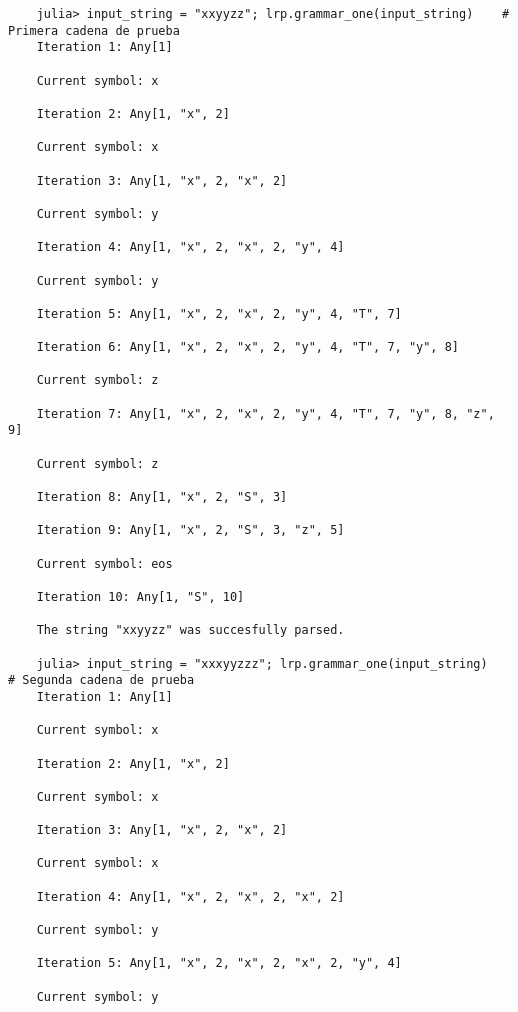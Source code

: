 \begin{verbatim}
    julia> input_string = "xxyyzz"; lrp.grammar_one(input_string)    # Primera cadena de prueba
    Iteration 1: Any[1] 

    Current symbol: x 

    Iteration 2: Any[1, "x", 2] 

    Current symbol: x 

    Iteration 3: Any[1, "x", 2, "x", 2] 

    Current symbol: y 

    Iteration 4: Any[1, "x", 2, "x", 2, "y", 4] 

    Current symbol: y 

    Iteration 5: Any[1, "x", 2, "x", 2, "y", 4, "T", 7] 

    Iteration 6: Any[1, "x", 2, "x", 2, "y", 4, "T", 7, "y", 8] 

    Current symbol: z 

    Iteration 7: Any[1, "x", 2, "x", 2, "y", 4, "T", 7, "y", 8, "z", 9] 

    Current symbol: z 

    Iteration 8: Any[1, "x", 2, "S", 3] 

    Iteration 9: Any[1, "x", 2, "S", 3, "z", 5] 

    Current symbol: eos 

    Iteration 10: Any[1, "S", 10] 

    The string "xxyyzz" was succesfully parsed.

    julia> input_string = "xxxyyzzz"; lrp.grammar_one(input_string)    # Segunda cadena de prueba
    Iteration 1: Any[1] 

    Current symbol: x 

    Iteration 2: Any[1, "x", 2] 

    Current symbol: x 

    Iteration 3: Any[1, "x", 2, "x", 2] 

    Current symbol: x 

    Iteration 4: Any[1, "x", 2, "x", 2, "x", 2] 

    Current symbol: y 

    Iteration 5: Any[1, "x", 2, "x", 2, "x", 2, "y", 4] 

    Current symbol: y 


\end{verbatim}

